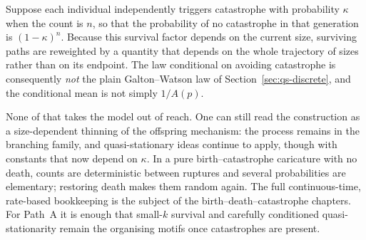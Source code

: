 Suppose each individual independently triggers catastrophe with probability $\kappa$ when the count is $n$, so that the probability of no catastrophe in that generation is $(1-\kappa)^n$. Because this survival factor depends on the current size, surviving paths are reweighted by a quantity that depends on the whole trajectory of sizes rather than on its endpoint. The law conditional on avoiding catastrophe is consequently \emph{not} the plain Galton--Watson law of Section~\ref{sec:qs-discrete}, and the conditional mean is not simply $1/A(p)$.

None of that takes the model out of reach. One can still read the construction as a size-dependent thinning of the offspring mechanism: the process remains in the branching family, and quasi-stationary ideas continue to apply, though with constants that now depend on $\kappa$. In a pure birth--catastrophe caricature with no death, counts are deterministic between ruptures and several probabilities are elementary; restoring death makes them random again. The full continuous-time, rate-based bookkeeping is the subject of the birth--death--catastrophe chapters. For Path~A it is enough that small-$k$ survival and carefully conditioned quasi-stationarity remain the organising motifs once catastrophes are present.

